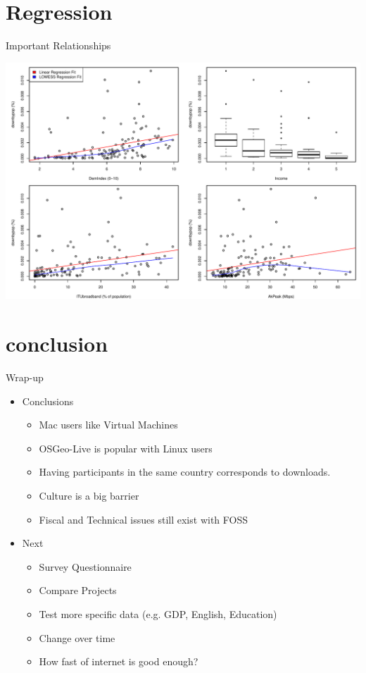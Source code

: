 \documentclass{beamer}
\begin{document}
\section{Regression}
\begin{frame}{Important Relationships}
	\begin{center}
			\includegraphics[width=1\textwidth]{ImportantVarGraph.pdf}	
	\end{center}
\end{frame}

\section{conclusion}
\begin{frame}{Wrap-up}
	\begin{itemize}
		\item Conclusions
			\begin{itemize}
				\item Mac users like Virtual Machines
				\item OSGeo-Live is popular with Linux users
				\item Having participants in the same country corresponds to downloads.
				\item Culture is a big barrier
				\item Fiscal and Technical issues still exist with FOSS
			\end{itemize}					
		\item Next
			\begin{itemize}
				\item Survey Questionnaire
				\item Compare Projects
				\item Test more specific data (e.g. GDP, English, Education)
				\item Change over time
				\item How fast of internet is good enough?
			\end{itemize}
		 
	\end{itemize}
\end{frame}
\end{document}
